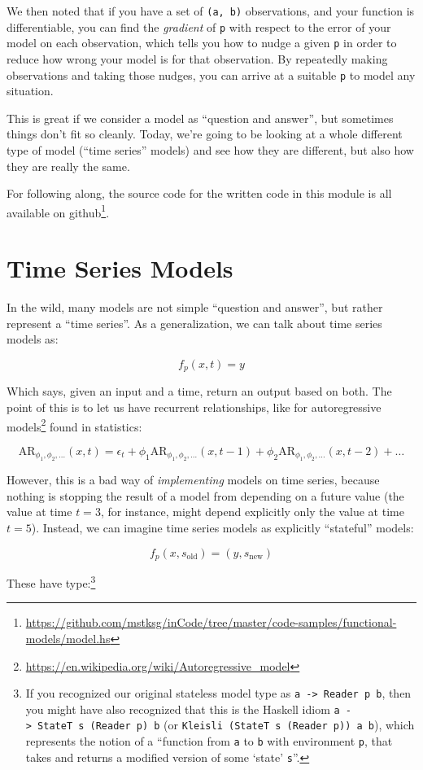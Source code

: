 \documentclass[]{article}
\renewcommand{\href}[2]{#2\footnote{\url{#1}}}
\begin{document}
We then noted that if you have a set of \texttt{(a,\ b)} observations, and your
function is differentiable, you can find the \emph{gradient} of \texttt{p} with
respect to the error of your model on each observation, which tells you how to
nudge a given \texttt{p} in order to reduce how wrong your model is for that
observation. By repeatedly making observations and taking those nudges, you can
arrive at a suitable \texttt{p} to model any situation.

This is great if we consider a model as ``question and answer'', but sometimes
things don't fit so cleanly. Today, we're going to be looking at a whole
different type of model (``time series'' models) and see how they are different,
but also how they are really the same.

For following along, the source code for the written code in this module is all
available
\href{https://github.com/mstksg/inCode/tree/master/code-samples/functional-models/model.hs}{on
github}.

\section{Time Series Models}\label{time-series-models}

In the wild, many models are not simple ``question and answer'', but rather
represent a ``time series''. As a generalization, we can talk about time series
models as:

\[
f_p(x,t) = y
\]

Which says, given an input and a time, return an output based on both. The point
of this is to let us have recurrent relationships, like for
\href{https://en.wikipedia.org/wiki/Autoregressive_model}{autoregressive models}
found in statistics:

\[
\text{AR}_{\phi_1, \phi_2, \ldots}(x,t)
  = \epsilon_t + \phi_1 \text{AR}_{\phi_1, \phi_2, \ldots}(x, t-1)
  + \phi_2 \text{AR}_{\phi_1, \phi_2, \ldots}(x, t-2)
  + \ldots
\]

However, this is a bad way of \emph{implementing} models on time series, because
nothing is stopping the result of a model from depending on a future value (the
value at time \(t = 3\), for instance, might depend explicitly only the value at
time \(t = 5\)). Instead, we can imagine time series models as explicitly
``stateful'' models:

\[
f_p(x, s_{\text{old}}) = (y, s_{\text{new}})
\]

These have type:\footnote{If you recognized our original stateless model type as
  \texttt{a\ -\textgreater{}\ Reader\ p\ b}, then you might have also recognized
  that this is the Haskell idiom
  \texttt{a\ -\textgreater{}\ StateT\ s\ (Reader\ p)\ b} (or
  \texttt{Kleisli\ (StateT\ s\ (Reader\ p))\ a\ b}), which represents the notion
  of a ``function from \texttt{a} to \texttt{b} with environment \texttt{p},
  that takes and returns a modified version of some `state' \texttt{s}''.}
\end{document}
